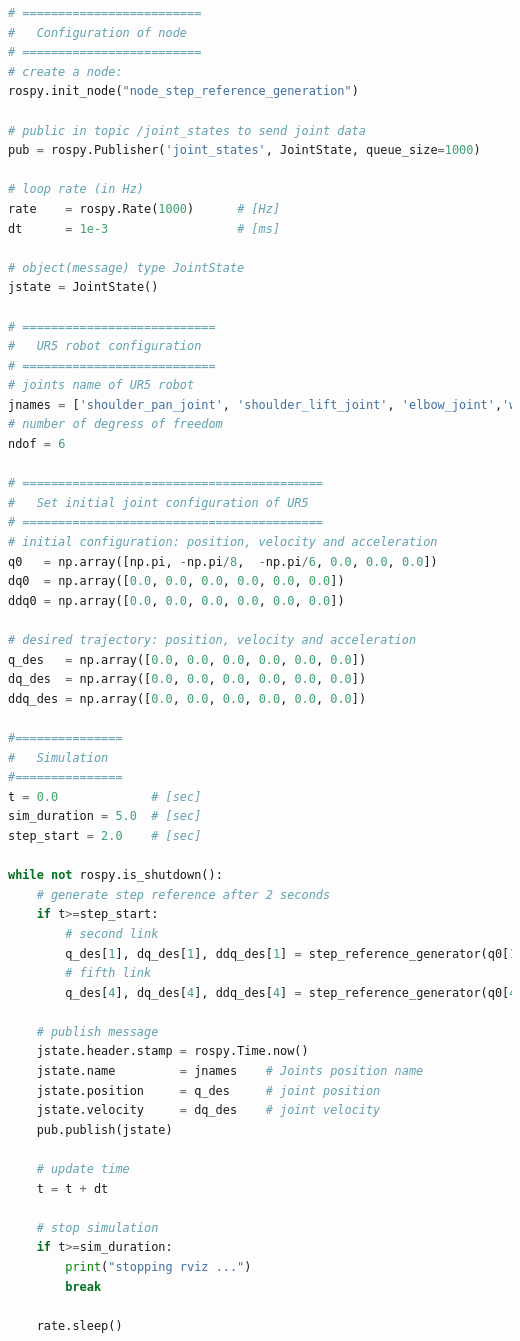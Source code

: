 \begin{lstlisting}[language=Python, caption={Move the second and fifth joint of UR5 robot with the required movement of activity 1.2.}, label={lst:rosnode_step_reference_generator}]
# =========================
#   Configuration of node
# =========================
# create a node: 
rospy.init_node("node_step_reference_generation")

# public in topic /joint_states	to send joint data	
pub = rospy.Publisher('joint_states', JointState, queue_size=1000)

# loop rate (in Hz)
rate 	= rospy.Rate(1000)		# [Hz]
dt 		= 1e-3					# [ms]

# object(message) type JointState
jstate = JointState()

# ===========================
#   UR5 robot configuration
# ===========================
# joints name of UR5 robot
jnames = ['shoulder_pan_joint', 'shoulder_lift_joint', 'elbow_joint','wrist_1_joint', 'wrist_2_joint', 'wrist_3_joint']
# number of degress of freedom
ndof = 6

# ==========================================
#   Set initial joint configuration of UR5
# ==========================================
# initial configuration: position, velocity and acceleration 
q0   = np.array([np.pi, -np.pi/8,  -np.pi/6, 0.0, 0.0, 0.0])
dq0  = np.array([0.0, 0.0, 0.0, 0.0, 0.0, 0.0])
ddq0 = np.array([0.0, 0.0, 0.0, 0.0, 0.0, 0.0]) 

# desired trajectory: position, velocity and acceleration
q_des   = np.array([0.0, 0.0, 0.0, 0.0, 0.0, 0.0])
dq_des  = np.array([0.0, 0.0, 0.0, 0.0, 0.0, 0.0])
ddq_des = np.array([0.0, 0.0, 0.0, 0.0, 0.0, 0.0])

#===============
#   Simulation
#===============
t = 0.0             # [sec] 
sim_duration = 5.0  # [sec]
step_start = 2.0    # [sec]

while not rospy.is_shutdown():
    # generate step reference after 2 seconds
    if t>=step_start:
        # second link
        q_des[1], dq_des[1], ddq_des[1] = step_reference_generator(q0[1],-0.4)
        # fifth link
        q_des[4], dq_des[4], ddq_des[4] = step_reference_generator(q0[4], 0.5)

    # publish message
    jstate.header.stamp = rospy.Time.now()
    jstate.name 		= jnames    # Joints position name
    jstate.position 	= q_des     # joint position
    jstate.velocity 	= dq_des    # joint velocity
    pub.publish(jstate)

    # update time
    t = t + dt
    
    # stop simulation    
    if t>=sim_duration:
        print("stopping rviz ...")
        break

    rate.sleep()

\end{lstlisting}



